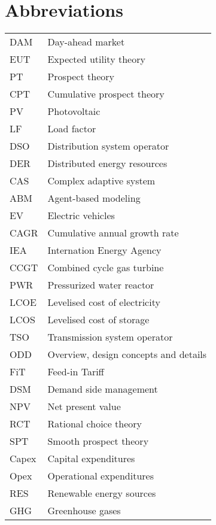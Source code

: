 \documentclass[master=ene,english]{kulemt}
\begin{document}
\section*{Abbreviations}
\begin{flushleft}
  \renewcommand{\arraystretch}{1.1}
  \begin{tabularx}{\textwidth}{@{}p{12mm}X@{}}
    DAM   & Day-ahead market \\
    EUT   & Expected utility theory \\
    PT  & Prospect theory \\
    CPT  & Cumulative prospect theory \\
    PV  & Photovoltaic \\
    LF  & Load factor \\
    DSO & Distribution system operator\\
    DER & Distributed energy resources\\
    CAS & Complex adaptive system\\
    ABM & Agent-based modeling\\
    EV & Electric vehicles\\
    CAGR & Cumulative annual growth rate\\
    IEA & Internation Energy Agency\\
    CCGT & Combined cycle gas turbine\\
    PWR & Pressurized water reactor\\
    LCOE & Levelised cost of electricity\\
    LCOS & Levelised cost of storage\\
    TSO & Transmission system operator\\
    ODD & Overview, design concepts and details\\
    FiT & Feed-in Tariff\\
    DSM & Demand side management\\
    NPV & Net present value\\
    RCT & Rational choice theory\\
    SPT & Smooth prospect theory\\
    Capex & Capital expenditures\\
    Opex & Operational expenditures\\
    RES & Renewable energy sources\\    
    GHG & Greenhouse gases\\
  \end{tabularx}
\end{flushleft}
\end{document}
